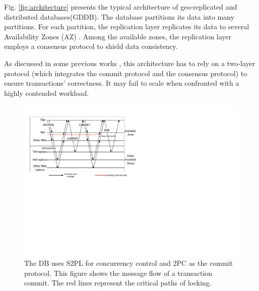 \documentclass[conference]{IEEEtran}
\begin{document}
Fig.    \ref{fig:architecture} presents the typical architecture of geo-replicated and distributed databases(GDDB).
The database partitions its data into many partitions.
For each partition, the replication layer replicates its data to several Availability Zones (AZ) \cite{Aurora:conf/sigmod/VerbitskiGSCGBM18}.
Among the available zones, the replication layer employs a consensus protocol to shield data consistency.

As discussed in some previous works \cite{Calvin:conf/sigmod/ThomsonDWRSA12}\cite{Tapir:conf/sosp/ZhangSSKP15}\cite{Janus:conf/osdi/MuNLL16},
this architecture has to rely on a two-layer protocol (which integrates the commit protocol and the consensus protocol) to ensure transactions' correctness.
It may fail to scale when confronted with a highly contended workload.


\begin{figure}[tbp]
  \centerline{\includegraphics[scale=0.60]{figure/message_flow.pdf}}
  \caption
  {
The DB uses S2PL for concurrency control and 2PC as the commit protocol.
This figure shows the message flow of a transaction commit.
The red lines represent the critical paths of locking.
    }
\label{fig:message_flow}
\end{figure}
\end{document}
